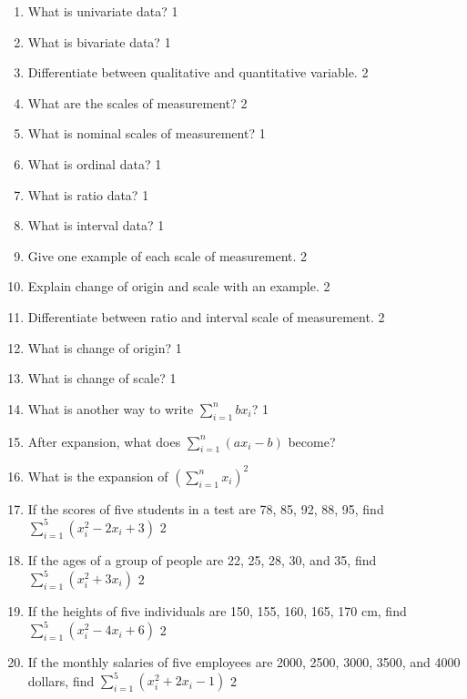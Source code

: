 \documentclass[a4paper,oneside]{book}
\begin{document}
\begin{enumerate}
\item What is univariate data? \hfill 1

\item What is bivariate data? \hfill 1

\item Differentiate between qualitative and quantitative variable. \hfill 2

\item What are the scales of measurement? \hfill 2

\item What is nominal scales of measurement? \hfill 1

\item What is ordinal data? \hfill 1

\item What is ratio data? \hfill 1

\item What is interval data? \hfill 1

\item Give one example of each scale of measurement. \hfill 2

\item Explain change of origin and scale with an example. \hfill 2

\item Differentiate between ratio and interval scale of measurement. \hfill 2

\item What is change of origin? \hfill 1

\item What is change of scale? \hfill 1

\item What is another way to write $\displaystyle \sum_{i=1}^n bx_i$?  \hfill 1

\item After expansion, what does 
$\displaystyle \sum_{i=1}^n \left( ax_i-b \right)$ become?

\item What is the expansion of $\displaystyle \left( \sum_{i=1}^n x_i\right)^2$

\item 
If the scores of five students in a test are 78, 85, 92, 88, 95, 
find $\displaystyle \sum_{i=1}^5 (x_i^2 - 2x_i + 3)$ \hfill 2

\item 
If the ages of a group of people are 22, 25, 28, 30, and 35, 
find $\displaystyle \sum_{i=1}^5 (x_i^2 + 3x_i)$ \hfill 2

\item 
If the heights of five individuals are 150, 155, 160, 165, 170 cm, 
find $\displaystyle \sum_{i=1}^5 (x_i^2 - 4x_i + 6)$ \hfill 2

\item 
If the monthly salaries of five employees are 2000, 2500, 3000, 3500, and 4000 
dollars, find $\displaystyle \sum_{i=1}^5 (x_i^2 + 2x_i - 1)$ \hfill 2


\end{enumerate}
\end{document}
